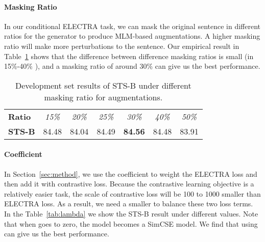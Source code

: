\documentclass[11pt]{article}
\begin{document}
\paragraph{Masking Ratio}

In our conditional ELECTRA task, we can mask the original sentence in different ratios for the generator to produce MLM-based augmentations. A higher masking ratio will make more perturbations to the sentence. Our empirical result in Table~\ref{tab:mask} shows that the difference between difference masking ratios is small (in 15\%-40\% ), and a masking ratio of around 30\% can give us the best performance.






\begin{table}[t!]
    \begin{center}
    \centering
    \small
    \begin{tabular}{lp{0.6cm}p{0.6cm}p{0.6cm}p{0.6cm}p{0.6cm}p{0.6cm}}
    \toprule
        \bf Ratio & \multicolumn{1}{c}{\it 15\%} & \multicolumn{1}{c}{\it 20\%} & \multicolumn{1}{c}{\it 25\%} & \multicolumn{1}{c}{\it 30\%} & \multicolumn{1}{c}{\it 40\%} & \multicolumn{1}{c}{\it 50\%} \\
        \bf STS-B & 84.48 & 84.04 & 84.49 & \bf 84.56 & 84.48 & 83.91 \\
    \bottomrule
    \end{tabular}
    \end{center}
\vspace{-3mm}
    \caption{
        Development set results of STS-B under different masking ratio for augmentations. 
    }
    \label{tab:mask}
\vspace{-3mm}
\end{table}


\paragraph{Coefficient }

In Section~\ref{sec:method}, we use the  coefficient to weight the ELECTRA loss and then add it with contrastive loss. Because the contrastive learning objective is a relatively easier task, the scale of contrastive loss will be 100 to 1000 smaller than ELECTRA loss. As a result, we need a smaller  to balance these two loss terms. In the Table~\ref{tab:lambda} we show the STS-B result under different  values. Note that when  goes to zero, the model becomes a SimCSE model. We find that using  can give us the best performance.
\end{document}
